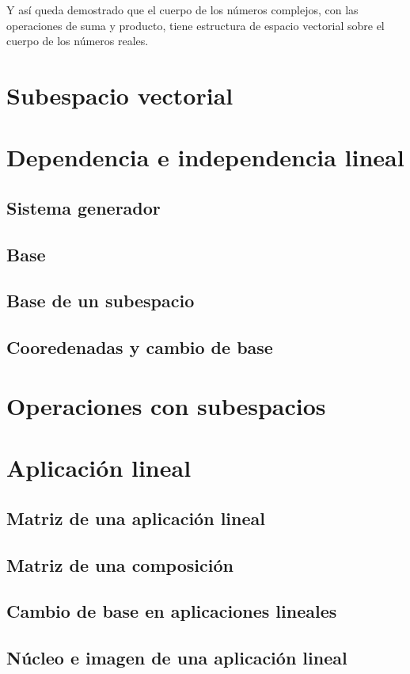 Y así queda demostrado que el cuerpo de los números complejos, con las operaciones de suma y producto, tiene estructura de espacio vectorial sobre el cuerpo de los números reales.
\section{Subespacio vectorial}

\section{Dependencia e independencia lineal}
\subsection{Sistema generador}
\subsection{Base}
\subsection{Base de un subespacio}
\subsection{Cooredenadas y cambio de base}

\section{Operaciones con subespacios}

\section{Aplicación lineal}
\subsection{Matriz de una aplicación lineal}
\subsection{Matriz de una composición}
\subsection{Cambio de base en aplicaciones lineales}
\subsection{Núcleo e imagen de una aplicación lineal}

